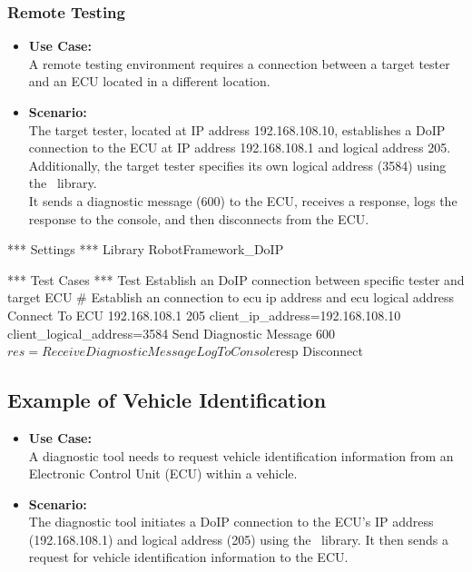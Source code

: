         \subsubsection{Remote Testing}
            \begin{itemize}
                \item\textbf{Use Case:}\\
                    A remote testing environment requires a connection between a target tester and an ECU located in a different location.

                \item\textbf{Scenario:} \\
                    The target tester, located at IP address 192.168.108.10, establishes a DoIP connection to the ECU at IP address 192.168.108.1 
                    and logical address 205. Additionally, the target tester specifies its own logical address (3584) using the \pkg\ 
                    library. \\
                    It sends a diagnostic message (600) to the ECU, receives a response, logs the response to the console, and then disconnects 
                    from the ECU.
            \end{itemize}

            \begin{robotcode}
*** Settings ***
Library    RobotFramework_DoIP

*** Test Cases ***
Test Establish an DoIP connection between specific tester and target ECU 
    # Establish an connection to ecu ip address and ecu logical address
    Connect To ECU     192.168.108.1      205       client_ip_address=192.168.108.10    client_logical_address=3584
    Send Diagnostic Message     600
    ${res}= Receive Diagnostic Message
    Log To Console    ${resp}
    Disconnect
            \end{robotcode}

    \subsection{Example of Vehicle Identification}
        \begin{itemize}
            \item\textbf{Use Case:}\\
                A diagnostic tool needs to request vehicle identification information from an Electronic Control Unit (ECU) within a vehicle.

            \item\textbf{Scenario:} \\
                The diagnostic tool initiates a DoIP connection to the ECU's IP address (192.168.108.1) and logical address (205) using the 
                \pkg\ library. It then sends a request for vehicle identification information to the ECU.
        \end{itemize}

